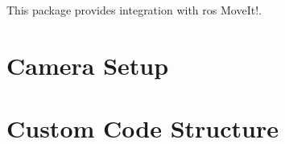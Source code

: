 This package provides integration with \gls{ros} MoveIt!.\\



\section{Camera Setup}
\label{sec:ros_setup_camera}


\section{Custom Code Structure}
\label{sec:ros_setup_custom_code}

